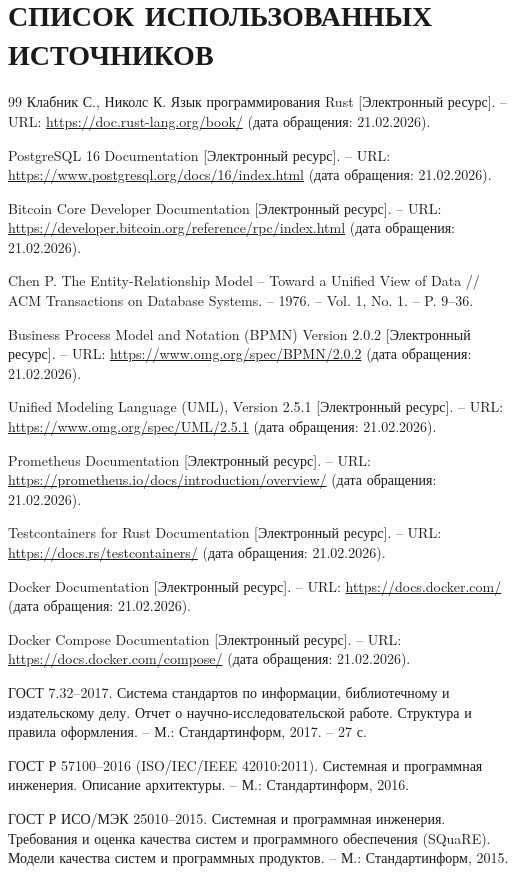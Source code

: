 ﻿\documentclass[14pt,a4paper]{extarticle}
\begin{document}
\section*{СПИСОК ИСПОЛЬЗОВАННЫХ ИСТОЧНИКОВ}
\begin{thebibliography}{99}
Клабник С., Николс К. Язык программирования Rust [Электронный ресурс]. -- URL: \url{https://doc.rust-lang.org/book/} (дата обращения: 21.02.2026).

PostgreSQL 16 Documentation [Электронный ресурс]. -- URL: \url{https://www.postgresql.org/docs/16/index.html} (дата обращения: 21.02.2026).

Bitcoin Core Developer Documentation [Электронный ресурс]. -- URL: \url{https://developer.bitcoin.org/reference/rpc/index.html} (дата обращения: 21.02.2026).

Chen P. The Entity-Relationship Model -- Toward a Unified View of Data // ACM Transactions on Database Systems. -- 1976. -- Vol. 1, No. 1. -- P. 9--36.

Business Process Model and Notation (BPMN) Version 2.0.2 [Электронный ресурс]. -- URL: \url{https://www.omg.org/spec/BPMN/2.0.2} (дата обращения: 21.02.2026).

Unified Modeling Language (UML), Version 2.5.1 [Электронный ресурс]. -- URL: \url{https://www.omg.org/spec/UML/2.5.1} (дата обращения: 21.02.2026).

Prometheus Documentation [Электронный ресурс]. -- URL: \url{https://prometheus.io/docs/introduction/overview/} (дата обращения: 21.02.2026).

Testcontainers for Rust Documentation [Электронный ресурс]. -- URL: \url{https://docs.rs/testcontainers/} (дата обращения: 21.02.2026).

Docker Documentation [Электронный ресурс]. -- URL: \url{https://docs.docker.com/} (дата обращения: 21.02.2026).

Docker Compose Documentation [Электронный ресурс]. -- URL: \url{https://docs.docker.com/compose/} (дата обращения: 21.02.2026).

ГОСТ 7.32--2017. Система стандартов по информации, библиотечному и издательскому делу. Отчет о научно-исследовательской работе. Структура и правила оформления. -- М.: Стандартинформ, 2017. -- 27 с.

ГОСТ Р 57100--2016 (ISO/IEC/IEEE 42010:2011). Системная и программная инженерия. Описание архитектуры. -- М.: Стандартинформ, 2016.

ГОСТ Р ИСО/МЭК 25010--2015. Системная и программная инженерия. Требования и оценка качества систем и программного обеспечения (SQuaRE). Модели качества систем и программных продуктов. -- М.: Стандартинформ, 2015.
\end{thebibliography}
\end{document}
